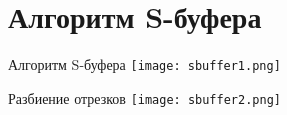\documentclass[10pt]{beamer}
\begin{document}
	\section{Алгоритм S-буфера}
	
	\begin{frame}{Алгоритм S-буфера}
		\centering\texttt{[image: sbuffer1.png]}		
	\end{frame}
	
	\begin{frame}{Разбиение отрезков}
		\centering\texttt{[image: sbuffer2.png]}		
	\end{frame}
	
	
	

	
 
 
\begin{comment}
	
\end{comment}
 
\end{document}
